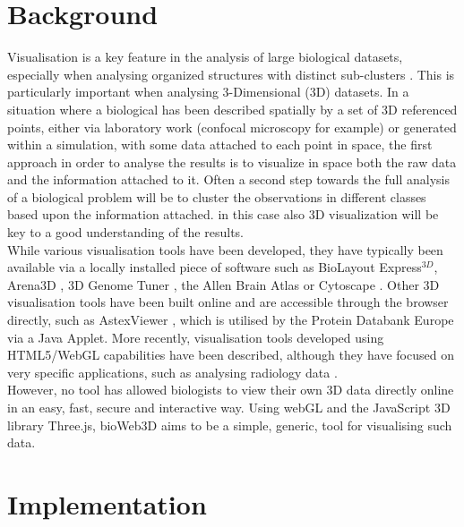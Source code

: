 \documentclass[10pt]{bmc_article}
\newenvironment{bmcformat}{\baselineskip20pt\sloppy\setboolean{publ}{false}}{\baselineskip20pt\sloppy}
\begin{document}
\begin{bmcformat}
\section{Background}

Visualisation is a key feature in the analysis of large biological datasets, especially when analysing organized structures with distinct sub-clusters \cite{Rubel10}. This is particularly important when analysing 3-Dimensional (3D) datasets. In a situation where a biological has been described spatially by a set of 3D referenced points, either via laboratory work (confocal microscopy for example) or generated within a simulation, with some data attached to each point in space, the first approach in order to analyse the results is to visualize in space both the raw data and the information attached to it. Often a second step towards the full analysis of a biological problem will be to cluster the observations in different classes based upon the information attached. in this case also 3D visualization will be key to a good understanding of the results. \\
While various visualisation tools have been developed, they have typically been available via a locally installed piece of software such as BioLayout Express$^{3D}$\cite{Freeman07}, Arena3D \cite{Pavlopoulos08},  3D Genome Tuner \cite{Wang09}, the Allen Brain Atlas \cite{Lein07} or Cytoscape \cite{Shannon03}. Other 3D visualisation tools have been built online and are accessible through the browser directly, such as AstexViewer \cite{Hartshorn02}, which is utilised by the Protein Databank Europe via a Java Applet. More recently, visualisation tools developed using HTML5/WebGL capabilities have been described, although they have focused on very specific applications, such as analysing radiology data  \cite{Dinesh12}.\\
However, no tool has allowed biologists to view their own 3D data directly online in an easy, fast, secure and interactive way. Using webGL and the JavaScript 3D library Three.js, bioWeb3D aims to be a simple, generic, tool for visualising such data. 





\section{Implementation}


\end{bmcformat}
\end{document}

